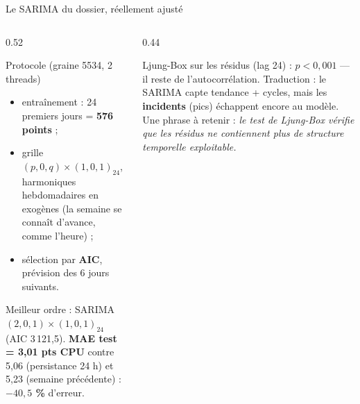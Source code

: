 \begin{frame}{Le SARIMA du dossier, réellement ajusté}
\begin{columns}[t]
\begin{column}{0.52\textwidth}
\begin{block}{Protocole (graine 5534, 2 threads)}
\begin{itemize}
\item entraînement : 24 premiers jours = \textbf{576 points} ;
\item grille $(p,0,q) \times (1,0,1)_{24}$, harmoniques hebdomadaires
en exogènes (la semaine se connaît d'avance, comme l'heure) ;
\item sélection par \textbf{AIC}, prévision des 6 jours suivants.
\end{itemize}
\end{block}
\begin{solbox}
Meilleur ordre : SARIMA$(2,0,1)\times(1,0,1)_{24}$
(AIC 3\,121,5). \textbf{MAE test = 3,01 pts CPU} contre 5,06
(persistance 24 h) et 5,23 (semaine précédente) : \textbf{$-40{,}5$ \%}
d'erreur.
\end{solbox}
\end{column}
\begin{column}{0.44\textwidth}
\begin{wbox}
Ljung-Box sur les résidus (lag 24) : $p < 0{,}001$ --- il reste de
l'autocorrélation. Traduction : le SARIMA capte tendance + cycles, mais
les \textbf{incidents} (pics) échappent encore au modèle.
\footnotesize Une phrase à retenir : \emph{le test de Ljung-Box vérifie
que les résidus ne contiennent plus de structure temporelle exploitable.}
\end{wbox}
\end{column}
\end{columns}
\end{frame}

